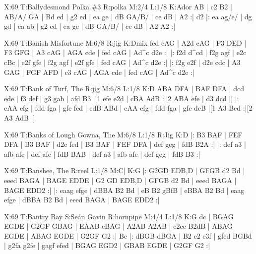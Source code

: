 \documentclass{article}
\begin{document}
\begin{abc}[name]
X:69
T:Ballydesmond Polka \#3
R:polka
M:2/4
L:1/8
K:Ador
AB | c2 B2 | AB/A/ GA | Bd ed | g2 ed |
ea ge | dB GA/B/ | ce dB | A2 :|
d2 |: ea ag/e/ | dg gd | ea ab | g2 ed |
ea ge | dB GA/B/ | ce dB | A2 A2 :|
\end{abc}

\begin{abc}[name]
X:69
T:Banish Misfortune
M:6/8
R:jig
K:Dmix
fed cAG | A2d cAG | F3 DED | F3 GFG |
A3 cAG | AGA cde | fed cAG | Ad^c d2e :|
|: f2d d^cd | f2g agf | e2c cBc | e2f gfe |
f2g agf | e2f gfe | fed cAG | Ad^c d2e :|
|: f2g e2f | d2e cdc | A3 GAG | FGF AFD |
c3 cAG | AGA cde | fed cAG | Ad^c d2e :|
\end{abc}

\begin{abc}[name]
X:69
T:Bank of Turf, The
R:jig
M:6/8
L:1/8
K:D
ABA DFA | BAF DFA | dcd ede | f3 def |
g3 gab | afd B3 |[1 efe e2d | cBA AdB :|[2 ABA efe | d3 dcd |]
|: eAA efg | fdd fga | gfe fed | edB ABd |
eAA efg | fdd fga | gfe dcB |[1 A3 Bcd :|[2 A3 AdB |]
\end{abc}

\begin{abc}[name]
X:69
T:Banks of Lough Gowna, The
M:6/8
L:1/8
R:Jig
K:D
|: B3 BAF | FEF DFA | B3 BAF | d2e fed |
B3 BAF | FEF DFA | def geg | fdB B2A :|
|: def a3 | afb afe | def afe | fdB BAB |
def a3 | afb afe | def geg | fdB B3 :|
\end{abc}

\begin{abc}[name]
X:69
T:Banshee, The
R:reel
L:1/8
M:C|
K:G
|: G2GD EDB,D | GFGB d2 Bd | eeed BAGA | BAGE EDDE |
 G2 GD EDB,D | GFGB d2 Bd | eeed BAGA | BAGE EDD2 :|
|: eaag efge | dBBA B2 Bd | eB B2 gBfB | eBBA B2 Bd |
 eaag efge | dBBA B2 Bd | eeed BAGA | BAGE EDD2 :|
\end{abc}

\begin{abc}[name]
X:69
T:Bantry Bay
S:Seán Gavin
R:hornpipe
M:4/4
L:1/8
K:G
dc | BGAG EGDE | G2GF GBAG | EAAB cBAG | A2AB A2AB |
c2ec B2dB | ABAG EGDE | ABAG EGDE | G2GF G2 :|
Bc |: dBGB dBGA | B2 e2 c3f | gfed BGBd | g2fa g2fe |
gagf efed | BGAG EGD2 | GBAB EGDE | G2GF G2 :|
\end{abc}
\end{document}
